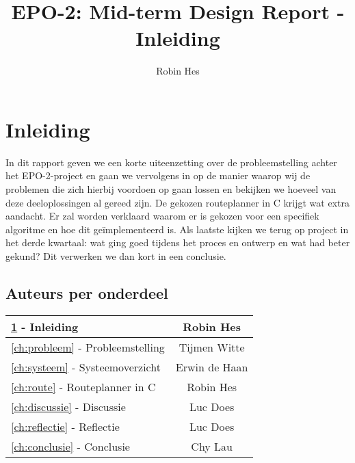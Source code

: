 \documentclass{report}
\title{EPO-2: Mid-term Design Report - Inleiding}
\author{Robin Hes}
\begin{document}
\chapter{Inleiding}
\label{ch:inleiding}

In dit rapport geven we een korte uiteenzetting over de probleemstelling achter het EPO-2-project en gaan we vervolgens in op de manier waarop wij de problemen die zich hierbij voordoen op gaan lossen en bekijken we hoeveel van deze deeloplossingen al gereed zijn. De gekozen routeplanner in C krijgt wat extra aandacht. Er zal worden verklaard waarom er is gekozen voor een specifiek algoritme en hoe dit geïmplementeerd is. Als laatste kijken we terug op project in het derde kwartaal: wat ging goed tijdens het proces en ontwerp en wat had beter gekund? Dit verwerken we dan kort in een conclusie. 

\section{Auteurs per onderdeel}

\begin{tabular}[l]{| l | c |}
	\hline
	\ref{ch:inleiding} - Inleiding & Robin Hes \\
	\hline
	\ref{ch:probleem} - Probleemstelling & Tijmen Witte \\
	\hline
	\ref{ch:systeem} - Systeemoverzicht & Erwin de Haan \\
	\hline
	\ref{ch:route} - Routeplanner in C & Robin Hes \\
	\hline
	\ref{ch:discussie} - Discussie & Luc Does\\
	\hline
	\ref{ch:reflectie} - Reflectie & Luc Does \\
	\hline
	\ref{ch:conclusie} - Conclusie & Chy Lau \\
	\hline	
\end{tabular}
\end{document}
